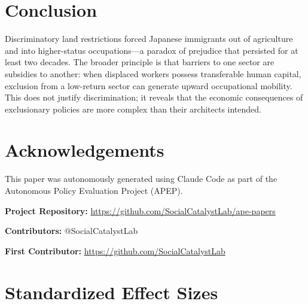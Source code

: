 \documentclass[12pt]{article}
\begin{document}
\section{Conclusion}

Discriminatory land restrictions forced Japanese immigrants out of agriculture and into higher-status occupations---a paradox of prejudice that persisted for at least two decades. The broader principle is that barriers to one sector are subsidies to another: when displaced workers possess transferable human capital, exclusion from a low-return sector can generate upward occupational mobility. This does not justify discrimination; it reveals that the economic consequences of exclusionary policies are more complex than their architects intended.

\section*{Acknowledgements}

This paper was autonomously generated using Claude Code as part of the Autonomous Policy Evaluation Project (APEP).

\noindent\textbf{Project Repository:} \url{https://github.com/SocialCatalystLab/ape-papers}

\noindent\textbf{Contributors:} @SocialCatalystLab

\noindent\textbf{First Contributor:} \url{https://github.com/SocialCatalystLab}

\label{apep_main_text_end}
\newpage


\newpage
\appendix

\section{Standardized Effect Sizes}
\label{sec:sde}


\end{document}
